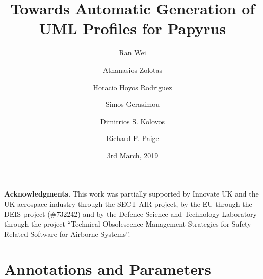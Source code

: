 \documentclass[global]{svjour}
\begin{document}
\title{Towards Automatic Generation of UML Profiles for Papyrus}

\author{Ran Wei \and Athanasios Zolotas \and Horacio Hoyos Rodriguez \and Simos Gerasimou \and Dimitrios S. Kolovos \and Richard F. Paige}

\date{3rd March, 2019}
\maketitle{}










\noindent\textbf{Acknowledgments.}
This work was partially supported by Innovate UK and the UK aerospace industry through the SECT-AIR project, by the EU through the DEIS project (\#732242) and by the Defence Science and Technology Laboratory through the project ``Technical Obsolescence Management Strategies for Safety-Related Software for Airborne Systems''.
\appendix
\section{Annotations and Parameters}

\clearpage


\end{document}
